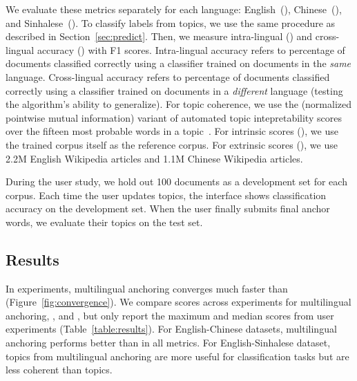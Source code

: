 We evaluate these metrics separately for each language: English~(), Chinese~(), and Sinhalese~().  To classify labels from topics, we use the same procedure as described in Section~\ref{sec:predict}.  Then, we measure intra-lingual () and cross-lingual accuracy () with F1 scores.  Intra-lingual accuracy refers to percentage of documents classified correctly using a classifier trained on documents in the \emph{same} language.  Cross-lingual accuracy refers to percentage of documents classified correctly using a classifier trained on documents in a \emph{different} language (testing the algorithm's ability to generalize).  For topic coherence, we use the  (normalized pointwise mutual information) variant of automated topic intepretability scores over the fifteen most probable words in a topic~\citep{lau-2014}. For intrinsic scores (), we use the trained corpus itself as the reference corpus. For extrinsic scores (), we use 2.2M English Wikipedia articles and 1.1M Chinese Wikipedia articles.


During the user study, we hold out 100 documents as a development set for each corpus.  Each time the user updates topics, the interface shows classification accuracy on the development set.  When the user finally submits final anchor words, we evaluate their topics on the test set.




\subsection{Results}

In experiments, multilingual anchoring converges much faster than  (Figure~\ref{fig:convergence}).  We compare scores across experiments for multilingual anchoring, \mtanchor, and , but only report the maximum and median scores from \mtanchor user experiments (Table~\ref{table:results}).   For English-Chinese datasets, multilingual anchoring performs better than  in all metrics.  For English-Sinhalese  dataset, topics from multilingual anchoring are more useful for classification tasks but are less coherent than  topics. 


